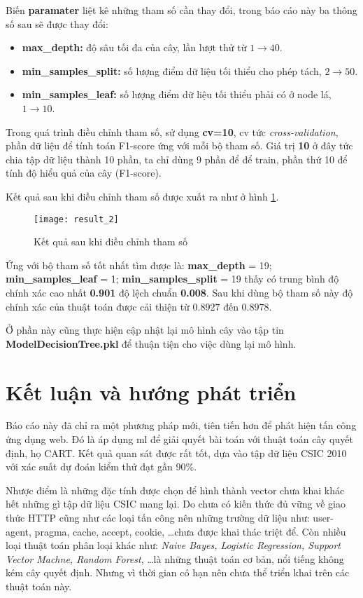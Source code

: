 \documentclass[../main-report.tex]{subfiles}
\begin{document}
Biến \textbf{paramater} liệt kê những tham số cần thay đổi, trong báo cáo này ba thông số sau sẽ được thay đổi:

\begin{itemize}
\item \textbf{max\_depth:} độ sâu tối đa của cây, lần lượt thử từ $1 \to 40$.
\item \textbf{min\_samples\_split:} số lượng điểm dữ liệu tối thiểu cho phép tách, $2 \to 50$.
\item \textbf{min\_samples\_leaf:} số lượng điểm dữ liệu tối thiểu phải có ở node lá, $1 \to 10$.
\end{itemize}

Trong quá trình điều chỉnh tham số, sử dụng \textbf{cv=10}, cv tức \emph{cross-validation}, phần dữ liệu để tính toán F1-score ứng với mỗi bộ tham số. Giá trị \textbf{10} ở đây tức chia tập dữ liệu thành 10 phần, ta chỉ dùng 9 phần để để train, phần thứ 10 để tính độ hiểu quả của cây (F1-score).

Kết quả sau khi điều chỉnh tham số được xuất ra như ở hình \ref{fig:result_2}.

\begin{figure}[ht!]
\centering\texttt{[image: result\_2]}
\caption{Kết quả sau khi điều chỉnh tham số}
\label{fig:result_2}
\end{figure}

Ứng với bộ tham số tốt nhất tìm được là: \textbf{max\_depth} = 19; \textbf{min\_samples\_leaf} = 1; \textbf{min\_samples\_split} = 19  thấy có trung bình độ chính xác cao nhất \textbf{0.901} độ lệch chuẩn \textbf{0.008}. Sau khi dùng bộ tham số này độ chính xác của thuật toán được cải thiện từ $0.8927$ đến $0.8978$.

Ở phần này cũng thực hiện cập nhật lại mô hình cây vào tập tin \textbf{ModelDecisionTree.pkl} để thuận tiện cho việc dùng lại mô hình.

\section{Kết luận và hướng phát triển}
Báo cáo này đã chỉ ra một phương pháp mới, tiên tiến hơn để phát hiện tấn công ứng dụng web. Đó là áp dụng \gls{ml} để giải quyết bài toán với thuật toán cây quyết định, họ CART. Kết quả quan sát được rất tốt, dựa vào tập dữ liệu CSIC 2010 với xác suất dự đoán kiểm thử đạt gần 90\%.

Nhược điểm là những đặc tính được chọn để hình thành vector chưa khai khác hết những gì tập dữ liệu CSIC mang lại. Do chưa có kiến thức đủ vững về giao thức HTTP cũng như các loại tấn công nên những trường dữ liệu như: user-agent, pragma, cache, accept, cookie, \ldots chưa được khai thác triệt để. Còn nhiều loại thuật toán phân loại khác như: \emph{Naive Bayes, Logistic Regression, Support Vector Machne, Random Forest}, \ldots là những thuật toán cơ bản, nổi tiếng không kém cây quyết định. Nhưng vì thời gian có hạn nên chưa thể triển khai trên các thuật toán này.
\end{document}
